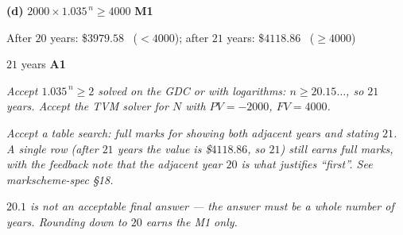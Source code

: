 \documentclass[12pt, twoside]{article}
\begin{document}
\begin{enumerate}[itemsep=0.3cm]
\medskip

\textbf{(d)} $2000 \times 1.035^{\,n} \ge 4000$ \hfill \textbf{M1}

After $20$ years: \$$3979.58$ \ ($< 4000$); \quad after $21$ years:
\$$4118.86$ \ ($\ge 4000$)

$21$ years \hfill \textbf{A1}

\emph{Accept $1.035^{\,n} \ge 2$ solved on the GDC or with logarithms:
$n \ge 20.15\ldots$, so $21$ years. Accept the TVM solver for $N$ with
$PV = -2000$, $FV = 4000$.}

\emph{Accept a table search: full marks for showing both adjacent
years and stating $21$. A single row (after $21$ years the value is
\$$4118.86$, so $21$) still earns full marks, with the feedback note
that the adjacent year $20$ is what justifies ``first''. See
markscheme-spec §18.}

\emph{$20.1$ is not an acceptable final answer --- the answer must be
a whole number of years. Rounding down to $20$ earns the M1 only.}

\end{enumerate}
\end{document}
